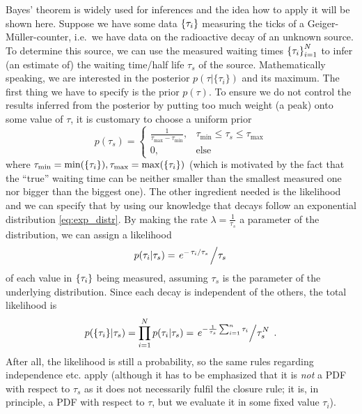 \begin{ex}
Bayes' theorem is widely used for inferences and the idea how to apply it will be shown here. Suppose we have some data $\qty{\tau_i}$ measuring the ticks of a Geiger-Müller-counter, i.e.~we have data on the radioactive decay of an unknown source. To determine this source, we can use the measured waiting times $\qty{\tau_i}_{i = 1}^N$ to infer (an estimate of) the waiting time/half life $\tau_s$ of the source. Mathematically speaking, we are interested in the posterior $p(\tau | \{\tau_i\})$ and its maximum. The first thing we have to specify is the prior $p(\tau)$. To ensure we do not control the results inferred from the posterior by putting too much weight (a peak) onto some value of $\tau$, it is customary to choose a uniform prior
\begin{equation*}
p(\tau_s) = \begin{cases} \frac{1}{\tau_\text{max} - \tau_\text{min}}, & \tau_\text{min} \leq \tau_s \leq \tau_\text{max} \\ 0, & \text{else} \end{cases}
\end{equation*}
where $\tau_\text{min} = \min(\qty{\tau_i}), \tau_\text{max} = \max(\qty{\tau_i})$ (which is motivated by the fact that the \enquote{true} waiting time can be neither smaller than the smallest measured one nor bigger than the biggest one). The other ingredient needed is the likelihood and we can specify that by using our knowledge that decays follow an exponential distribution \eqref{eq:exp_distr}. By making the rate $\lambda = \frac{1}{\tau_s}$ a parameter of the distribution, we can assign a likelihood
\begin{equation*}
p(\tau_i | \tau_s) = \flatfrac{e^{- \flatfrac{\tau_i}{\tau_s}}}{\tau_s}
\end{equation*}
of each value in $\qty{\tau_i}$ being measured, assuming $\tau_s$ is the parameter of the underlying distribution. Since each decay is independent of the others, the total likelihood is
\begin{equation*}
p(\{\tau_i\} | \tau_s) = \prod_{i = 1}^N p(\tau_i | \tau_s) = \flatfrac{e^{- \frac{1}{\tau_s} \sum_{i = 1}^n \tau_i}}{\tau_s^N} \, .
\end{equation*}
After all, the likelihood is still a probability, so the same rules regarding independence etc. apply (although it has to be emphasized that it is \emph{not} a PDF with respect to $\tau_s$ as it does not necessarily fulfil the closure rule; it is, in principle, a PDF with respect to $\tau$, but we evaluate it in some fixed value $\tau_i$).


\end{ex}
